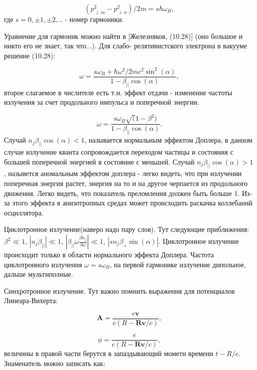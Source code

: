 \documentclass[10pt, a4paper]{article}
\numberwithin{equation}{section}
\begin{document}
\begin{equation}
    (p_{\perp m}^2 - p_{\perp n}^2)/2m = s\hbar\omega_B,
\end{equation}
где $s = 0, \pm1, \pm2, ..$ - номер гармоники.

Уравнение для гармоник можно найти в [Железняков, (10.28)] (оно большое и никто его не знает, так что...). Для слабо-
релятивистского электрона в вакууме решение (10.28):

\begin{equation}
    \omega = \frac{s\omega_B + \hbar \omega^2/2mc^2 \sin^2(\alpha)}{1-\beta_{||}\cos(\alpha)},
\end{equation}
второе слагаемое в числителе есть т.н. эффект отдачи - изменение частоты излучения за счет продольного импульса и
поперечной энергии.

\begin{equation}
    \omega = \frac{s\omega_B \sqrt(1-\beta^2)}{1-\beta_{||}\cos(\alpha)}.
\end{equation}
Случай $n_j\beta_{||}\cos(\alpha)<1$, называется нормальным эффектом Доплера, в данном случае излучение кванта
сопровождается переходом частицы и состояния с большей поперечной энергией в состояние с меньшей. Случай $n_j\beta_{||}\cos(\alpha)>1$,
назывется аномальным эффектом доплера - легко видеть, что при излучении поперечная энергия растет, энергия на то и на 
другое черпается из продольного движения. Легко видеть, что показатель преломления должен быть больше 1.
Из-за этого эффекта в анизотропных средах может происходить раскачка коллебаний осциллятора.

Циклотронное излучение(наверо надо пару слов). Тут следующие приближения: $\beta^2\ll1$, $|n_j\beta_{||}|\ll1$,
$|\beta_{||}\omega\frac{\partial n_j}{\partial \omega}|\ll1$, $|sn_j\beta_{\perp}\sin(\alpha)|$. Циклотронное 
излучение происходит только в области нормального эффекта Доплера. Частота циклотронного излучения $\omega=s\omega_B$,
на первой гармонике излучение дипольное, дальше мультиполные.

Синхротронное излучение.
Тут важно помнить выражения для потенциалов Линеара-Вихерта:

\begin{equation}
    \mathbf{A}=\frac{e\mathbf{v}}{c(R-\mathbf{R}\mathbf{v}/c)},
\end{equation}

\begin{equation}
    \phi=\frac{e}{c(R-\mathbf{R}\mathbf{v}/c)},
\end{equation}
величины в правой части берутся в запаздывающий мометн времени $t-R/c$. Знаменатель можно записать как:
\end{document}
